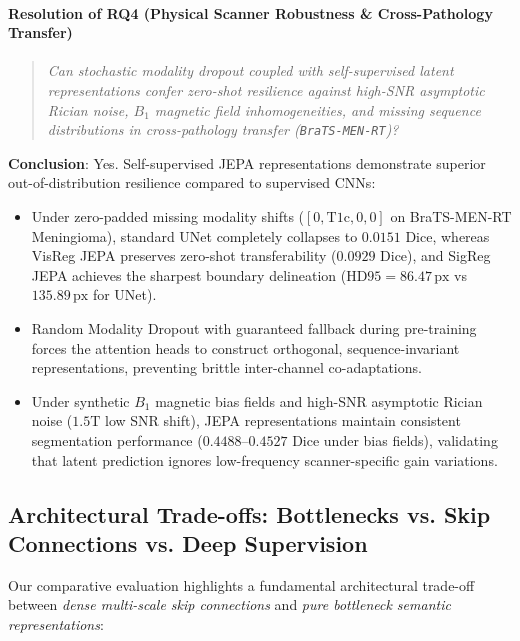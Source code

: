 \documentclass{article}
\begin{document}
\paragraph{Resolution of RQ4 (Physical Scanner Robustness \& Cross-Pathology Transfer)}
\begin{quote}
\emph{Can stochastic modality dropout coupled with self-supervised latent representations confer zero-shot resilience against high-SNR asymptotic Rician noise, $B_1$ magnetic field inhomogeneities, and missing sequence distributions in cross-pathology transfer (\texttt{BraTS-MEN-RT})?}
\end{quote}
\textbf{Conclusion}: Yes. Self-supervised JEPA representations demonstrate superior out-of-distribution resilience compared to supervised CNNs:
\begin{itemize}
    \item Under zero-padded missing modality shifts ($[0, \text{T1c}, 0, 0]$ on BraTS-MEN-RT Meningioma), standard UNet completely collapses to $0.0151$ Dice, whereas VisReg JEPA preserves zero-shot transferability ($0.0929$ Dice), and SigReg JEPA achieves the sharpest boundary delineation ($\text{HD95} = 86.47\,\text{px}$ vs $135.89\,\text{px}$ for UNet).
    \item Random Modality Dropout with guaranteed fallback during pre-training forces the attention heads to construct orthogonal, sequence-invariant representations, preventing brittle inter-channel co-adaptations.
    \item Under synthetic $B_1$ magnetic bias fields and high-SNR asymptotic Rician noise ($1.5\text{T}$ low SNR shift), JEPA representations maintain consistent segmentation performance ($0.4488$--$0.4527$ Dice under bias fields), validating that latent prediction ignores low-frequency scanner-specific gain variations.
\end{itemize}

\subsection{Architectural Trade-offs: Bottlenecks vs. Skip Connections vs. Deep Supervision}

Our comparative evaluation highlights a fundamental architectural trade-off between \emph{dense multi-scale skip connections} and \emph{pure bottleneck semantic representations}:
\end{document}
